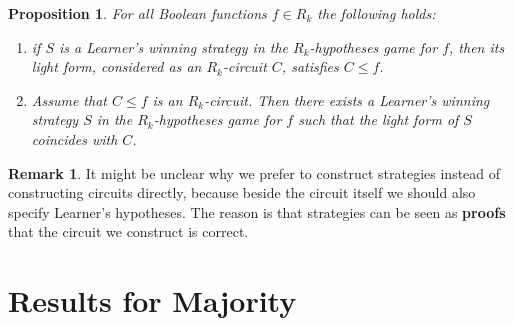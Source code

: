 \documentclass[11pt]{article}
\numberwithin{equation}{section}
\newtheorem{proposition}[theorem]{Proposition}
\theoremstyle{definition}
\newtheorem{remark}[theorem]{Remark}
\theoremstyle{plain}
\begin{document}
\begin{proposition}
\label{R_k_equivalence}
For all Boolean functions $f\in R_k$ the following holds:
\begin{enumerate}[label=(\alph*)]
\item if $S$ is a Learner's winning strategy in the $R_k$-hypotheses game for $f$, then its light form, considered as an $R_k$-circuit $C$, satisfies $C\le f$.


\item  Assume that $C\le f$ is an $R_k$-circuit. Then there exists a Learner's winning strategy $S$ in the $R_k$-hypotheses game for $f$ such that the light form of $S$ coincides with $C$.
\end{enumerate}
\end{proposition}
\begin{remark}
It might be unclear why we prefer to construct strategies instead of constructing circuits directly, because beside the circuit itself we should also specify Learner's hypotheses. The reason is that strategies can be seen as \textbf{proofs} that the circuit we construct is correct.
\end{remark}





















\section{Results for Majority} \label{sec:majority}
\end{document}
